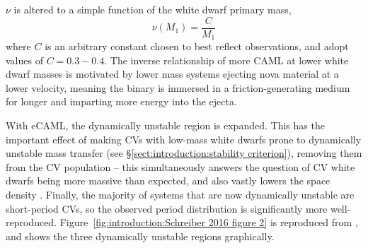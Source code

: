 $\nu$ is altered to a simple function of the white dwarf primary mass,
\begin{equation}
    \label{eqn:introduction:eCAML nu}
    \nu ( M_1 ) = \frac{C}{ M_1 }
\end{equation}
where $C$ is an arbitrary constant chosen to best reflect observations, and \citep{Schreiber2016} adopt values of $C = 0.3 - 0.4$. 
The inverse relationship of more CAML at lower white dwarf masses is motivated by lower mass systems ejecting nova material at a lower velocity, meaning the binary is immersed in a friction-generating medium for longer and imparting more energy into the ejecta. 

With eCAML, the dynamically unstable region is expanded. This has the important effect of making CVs with low-mass white dwarfs prone to dynamically unstable mass transfer (see \S\ref{sect:introduction:stability criterion}), removing them from the CV population -- this simultaneously answers the question of CV white dwarfs being more massive than expected, and also vastly lowers the space density \citep{belloni2018}. Finally, the majority of systems that are now dynamically unstable are short-period CVs, so the observed period distribution is significantly more well-reproduced. Figure~\ref{fig:introduction:Schreiber 2016 figure 2} is reproduced from \citet{Schreiber2016}, and shows the three dynamically unstable regions graphically.

